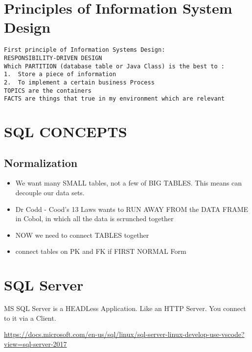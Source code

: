 \section  *  {Principles of Information System Design}

\begin{verbatim}
First principle of Information Systems Design:
RESPONSIBILITY-DRIVEN DESIGN
Which PARTITION (database table or Java Class) is the best to :
1.	Store a piece of information
2.	To implement a certain business Process
TOPICS are the containers
FACTS are things that true in my environment which are relevant
\end{verbatim}

\section  * {SQL CONCEPTS}
	\subsection  * {Normalization}
	
	\begin{itemize}
	    \item We want many SMALL tables, not a few of BIG TABLES. This means can decouple our data sets.
	    \item Dr Codd - Cood's 13 Laws wants to RUN AWAY FROM the DATA FRAME in Cobol, in which all the data is scrunched together
	    \item NOW we need to connect TABLES together
	    \item connect tables on PK and FK if FIRST NORMAL Form

	\end{itemize}
		
\section {SQL Server}		
MS SQL Server is a HEADLess Application. Like an HTTP Server. You connect to it via a Client.		
			
\url{https://docs.microsoft.com/en-us/sql/linux/sql-server-linux-develop-use-vscode?view=sql-server-2017}	